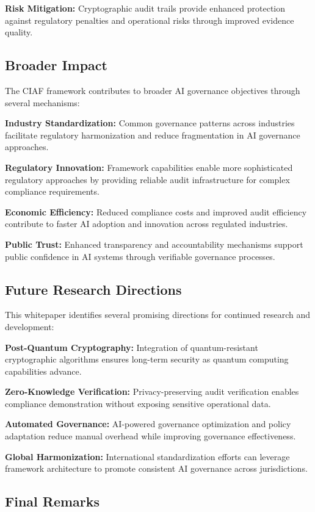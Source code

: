 \documentclass[12pt,a4paper]{article}
\begin{document}
\textbf{Risk Mitigation:} Cryptographic audit trails provide enhanced protection against regulatory penalties and operational risks through improved evidence quality.

\subsection{Broader Impact}

The CIAF framework contributes to broader AI governance objectives through several mechanisms:

\textbf{Industry Standardization:} Common governance patterns across industries facilitate regulatory harmonization and reduce fragmentation in AI governance approaches.

\textbf{Regulatory Innovation:} Framework capabilities enable more sophisticated regulatory approaches by providing reliable audit infrastructure for complex compliance requirements.

\textbf{Economic Efficiency:} Reduced compliance costs and improved audit efficiency contribute to faster AI adoption and innovation across regulated industries.

\textbf{Public Trust:} Enhanced transparency and accountability mechanisms support public confidence in AI systems through verifiable governance processes.

\subsection{Future Research Directions}

This whitepaper identifies several promising directions for continued research and development:

\textbf{Post-Quantum Cryptography:} Integration of quantum-resistant cryptographic algorithms ensures long-term security as quantum computing capabilities advance.

\textbf{Zero-Knowledge Verification:} Privacy-preserving audit verification enables compliance demonstration without exposing sensitive operational data.

\textbf{Automated Governance:} AI-powered governance optimization and policy adaptation reduce manual overhead while improving governance effectiveness.

\textbf{Global Harmonization:} International standardization efforts can leverage framework architecture to promote consistent AI governance across jurisdictions.

\subsection{Final Remarks}
\end{document}
